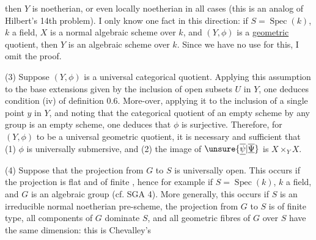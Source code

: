
then $Y$ is noetherian, or even locally noetherian in all cases (this is an analog of Hilbert's 14th problem). I only know one fact in this direction: if $S=\operatorname{Spec}(k)$, $k$ a field, $X$ is a normal algebraic scheme over $k$, and $(Y,\phi)$ is a \uline{geometric} quotient, then $Y$ is an algebraic scheme over $k$. Since we have no use for this, I omit the proof.

(3) Suppose $(Y,\phi)$ is a universal categorical quotient. Applying this assumption to the base extensions given by the inclusion of open subsets $U$ in $Y$, one deduces condition (iv) of definition 0.6. More-over, applying it to the inclusion of a single point $y$ in $Y$, and noting that the categorical quotient of an empty scheme by any group is an empty scheme, one deduces that $\phi$ is surjective. Therefore, for $(Y,\phi)$ to be a universal geometric quotient, it is necessary and sufficient that (1) $\phi$ is universally submersive, and (2) the image of $\unsure{\overline{\underline{\psi}}|\overline{\underline{\Psi}}}$ is $X\times_Y X$.

(4) Suppose that the projection from $G$ to $S$ is universally open. This occurs if the projection is flat and of  finite , hence for example if $S=\operatorname{Spec}(k)$, $k$ a field, and $G$ is an algebraic group (cf. SGA 4). More generally, this occurs if $S$ is an irreducible normal noetherian pre-scheme, the projection from $G$ to $S$ is  of finite type, all components of $G$ dominate $S$, and all geometric fibres of $G$ over $S$ have the same dimension: this is Chevalley's
